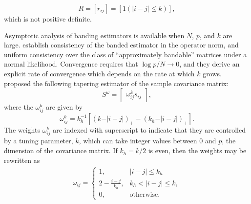 \[
R = \left[r_{ij}\right] = \left[ 1\left(\vert i-j \vert \le k\right)\right],
\] 
\noindent
which is not positive definite. %

\bigskip

Asymptotic analysis of banding estimators is available when $N$, $p$, and $k$ are large. \cite{bickel2008regularized} establish consistency of the banded estimator in the operator norm, and uniform consistency over the class of ``approximately bandable'' matrices under a normal likelihood. Convergence requires that $\log p/ N \rightarrow 0$, and they derive an explicit rate of convergence which depends on the rate at which $k$ grows. \cite{cai2010optimal} proposed the following tapering estimator of the sample covariance matrix:
\begin{equation} \label{eq:cai-tapering-estimator}
S^{\omega} =  \begin{bmatrix} \omega_{ij}^k s_{ij} \end{bmatrix},
\end{equation}
\noindent
where the $\omega_{ij}^k$ are given by 
\begin{equation*}
\omega^k_{ij} = k_h^{-1} \left[ \left( k - \vert i-j\vert\right)_+ - \left(k_h - \vert i-j\vert\right)_+ \right].
\end{equation*}
\noindent
The weights $\omega^k_{ij}$ are indexed with superscript to indicate that they  are controlled by a tuning parameter, $k$,  which can take integer values between 0 and $p$, the dimension of the covariance matrix.  If $k_h = k/2$ is even, then the weights may be rewritten as
\begin{align*}
\omega_{ij} = \left\{\begin{array}{ll} 1, & \vert i -j  \vert \le k_h \\
                             2 - \frac{i - j}{k_h}, & k_h < \vert i -j  \vert \le k, \\
                             0, & \mbox{otherwise}.  \end{array} \right.
\end{align*}
